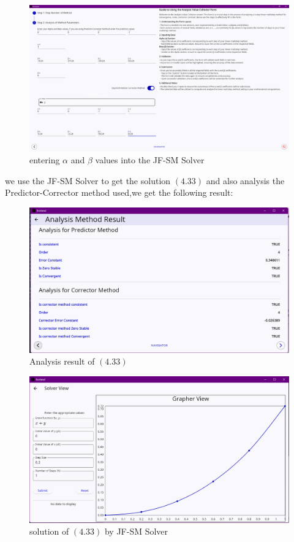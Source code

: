 \documentclass[a4paper, twoside]{report} %
\begin{document}
	\begin{figure}[htbp]
		\centering
		\includegraphics[width=1\textwidth]{chapters/4/image/solver_5.png}
		\caption{entering $\alpha$ and $\beta$ values into the JF-SM Solver }
	\end{figure}


	we use the JF-SM Solver to get the solution $(4.33)$ and also analysis the Predictor-Corrector method  used,we get the following result:


	\begin{figure}[htbp]
		\centering
		\includegraphics[width=1\textwidth]{chapters/4/image/solver_6.png}
		\caption{Analysis result of $(4.33)$ }
	\end{figure}


	\begin{figure}[htbp]
		\centering
		\includegraphics[width=1\textwidth]{chapters/4/image/solver_7.png}
		\caption{solution of $(4.33)$ by JF-SM Solver}
	\end{figure}
\end{document}
